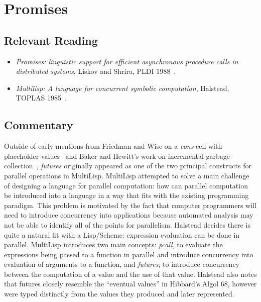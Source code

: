 \section{Promises}

\subsection{Relevant Reading}

\begin{itemize}
	\item \textit{Promises: linguistic support for efficient asynchronous procedure calls in distributed systems}, Liskov and Shrira, PLDI 1988~\cite{liskov1988promises}.
	\item \textit{Multilisp: A language for concurrent symbolic computation}, Halstead, TOPLAS 1985~\cite{halstead1985multilisp}.
\end{itemize}

\subsection{Commentary}

Outside of early mentions from Friedman and Wise on a \textit{cons} cell with placeholder values~\cite{1675100} and Baker and Hewitt's work on incremental garbage collection~\cite{Baker:1977:IGC:872734.806932}, \textit{futures} originally appeared as one of the two principal constructs for parallel operations in MultiLisp.  MultiLisp attempted to solve a main challenge of designing a language for parallel computation: how can parallel computation be introduced into a language in a way that fits with the existing programming paradigm.  This problem is motivated by the fact that computer programmers will need to introduce concurrency into applications because automated analysis may not be able to identify all of the points for parallelism.  Halstead decides there is quite a natural fit with a Lisp/Scheme: expression evaluation can be done in parallel.  MultiLisp introduces two main concepts: \textit{pcall}, to evaluate the expressions being passed to a function in parallel and introduce concurrency into evaluation of arguments to a function, and \textit{futures}, to introduce concurrency between the computation of a value and the use of that value.  Halstead also notes that futures closely resemble the ``eventual values'' in Hibbard's Algol 68, however were typed distinctly from the values they produced and later represented.~\cite{halstead1985multilisp}

